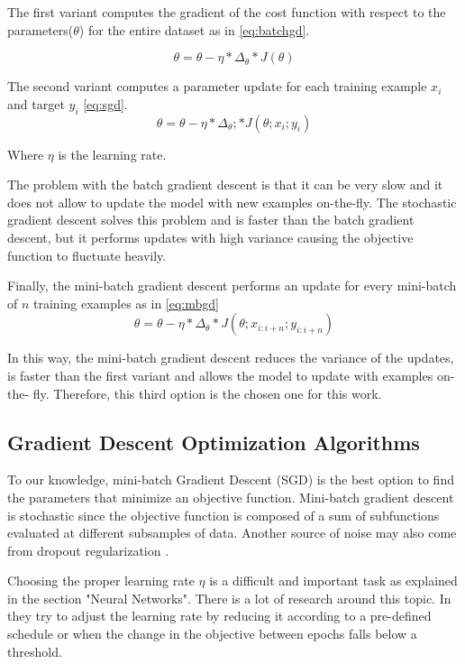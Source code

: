The first variant computes the gradient of the cost function with respect to the parameters($\theta$) for the entire dataset as in \ref{eq:batchgd}.

\begin{equation} \label{eq:batchgd}
\theta=\theta-\eta * \Delta_\theta * J(\theta)
\end{equation}

The second variant computes a parameter update for each training example $x_i$ and target $y_i$ \ref{eq:sgd}.
\begin{equation} \label{eq:sgd}
\theta=\theta-\eta * \Delta_\theta; * J(\theta;x_i;y_i)
\end{equation}

Where $\eta$ is the learning rate.

The problem with the batch gradient descent is that it can be very slow and it does not allow to update the model with new examples on-the-fly. The stochastic gradient descent solves this problem and is faster than the batch gradient descent, but it performs updates with high variance causing the objective function to fluctuate heavily.  

Finally, the mini-batch gradient descent performs an update for every mini-batch of $n$ training examples as in \ref{eq:mbgd} \begin{equation} \label{eq:mbgd}
\theta=\theta-\eta * \Delta_\theta * J(\theta;x_{i:i+n};y_{i:i+n})
\end{equation}

In this way, the mini-batch gradient descent reduces the variance of the updates, is faster than the first variant and allows the model to update with examples on-the- fly. Therefore, this third option is the chosen one for this work\cite{ruder2016overview}. 

\subsection{Gradient Descent Optimization Algorithms}
To our knowledge, mini-batch Gradient Descent (SGD) is the best option to find the parameters that minimize an objective function. Mini-batch gradient descent is stochastic since the objective function is composed of a sum of subfunctions evaluated at different subsamples of data. Another source of noise may also come from dropout regularization \cite{kingma2014adam}. 

Choosing the proper learning rate $\eta$ is a difficult and important task as explained in the section "Neural Networks". There is a lot of research around this topic. In \cite{robbins1951stochastic} they try to adjust the learning rate by reducing it according to a pre-defined schedule or when the change in the objective between epochs falls below a threshold. 

